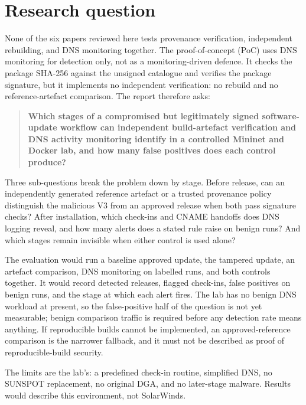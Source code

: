 \section{Research question}
\label{sec:question}

None of the six papers reviewed here tests provenance verification, independent rebuilding, and DNS monitoring together. The proof-of-concept (PoC) uses DNS monitoring for detection only, not as a monitoring-driven defence. It checks the package SHA-256 against the unsigned catalogue and verifies the package signature, but it implements no independent verification: no rebuild and no reference-artefact comparison. The report therefore asks:

\begin{quote}
\textbf{Which stages of a compromised but legitimately signed software-update workflow can independent build-artefact verification and DNS activity monitoring identify in a controlled Mininet and Docker lab, and how many false positives does each control produce?}
\end{quote}

Three sub-questions break the problem down by stage. Before release, can an independently generated reference artefact or a trusted provenance policy distinguish the malicious V3 from an approved release when both pass signature checks? After installation, which check-ins and CNAME handoffs does DNS logging reveal, and how many alerts does a stated rule raise on benign runs? And which stages remain invisible when either control is used alone?

The evaluation would run a baseline approved update, the tampered update, an artefact comparison, DNS monitoring on labelled runs, and both controls together. It would record detected releases, flagged check-ins, false positives on benign runs, and the stage at which each alert fires. The lab has no benign DNS workload at present, so the false-positive half of the question is not yet measurable; benign comparison traffic is required before any detection rate means anything. If reproducible builds cannot be implemented, an approved-reference comparison is the narrower fallback, and it must not be described as proof of reproducible-build security.

The limits are the lab's: a predefined check-in routine, simplified DNS, no SUNSPOT replacement, no original DGA, and no later-stage malware. Results would describe this environment, not SolarWinds.
